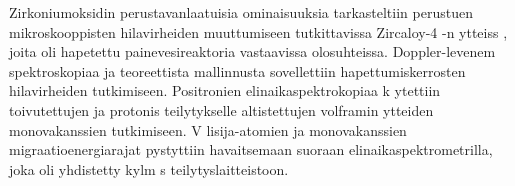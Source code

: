 \documentclass{article}
\begin{document}
{Zirkoniumoksidin perustavanlaatuisia ominaisuuksia tarkasteltiin perustuen 
mikroskooppisten hilavirheiden muuttumiseen tutkittavissa Zircaloy-4 -n yt\-teiss , joita
oli hapetettu painevesireaktoria vastaavissa olosuhteissa. Doppler-levenem \-spektroskopiaa
ja teoreettista mallinnusta sovellettiin hapettumiskerrosten hilavirheiden tutkimiseen. 
Positronien elinaikaspektrokopiaa k ytettiin toivutettujen ja protonis teilytykselle 
altistettujen volframin ytteiden monovakanssien tutkimiseen. V lisija-atomien
ja monovakanssien migraatioenergiarajat pystyttiin havaitsemaan suoraan 
elinaikaspektrometrilla, joka oli yhdistetty kylm s teilytyslaitteistoon.

}%


\draftabstract[swedish]{\lipsum[7-9]}
\end{document}
